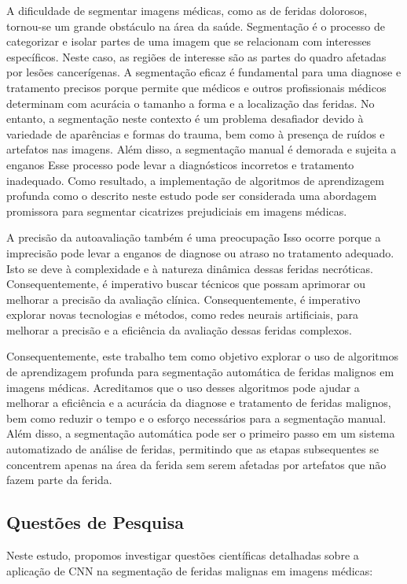 A dificuldade de segmentar imagens médicas, como as de feridas dolorosos, tornou-se um grande obstáculo na área da saúde. Segmentação é o processo de categorizar e isolar partes de uma imagem que se relacionam com interesses específicos. Neste caso, as regiões de interesse são as partes do quadro afetadas por lesões cancerígenas. A segmentação eficaz é fundamental para uma diagnose e tratamento precisos porque permite que médicos e outros profissionais médicos determinam com acurácia o tamanho a forma e a localização das feridas. No entanto, a segmentação neste contexto é um problema desafiador devido à variedade de aparências e formas do trauma, bem como à presença de ruídos e artefatos nas imagens. Além disso, a segmentação manual é demorada e sujeita a enganos Esse processo pode levar a diagnósticos incorretos e tratamento inadequado. Como resultado, a implementação de algoritmos de aprendizagem profunda como o descrito neste estudo pode ser considerada uma abordagem promissora para segmentar cicatrizes prejudiciais em imagens médicas.

A precisão da autoavaliação também é uma preocupação Isso ocorre porque a imprecisão pode levar a enganos de diagnose ou atraso no tratamento adequado. Isto se deve à complexidade e à natureza dinâmica dessas feridas necróticas. Consequentemente, é imperativo buscar técnicos que possam aprimorar ou melhorar a precisão da avaliação clínica. Consequentemente, é imperativo explorar novas tecnologias e métodos, como redes neurais artificiais, para melhorar a precisão e a eficiência da avaliação dessas feridas complexos.

Consequentemente, este trabalho tem como objetivo explorar o uso de algoritmos de aprendizagem profunda para segmentação automática de feridas malignos em imagens médicas. Acreditamos que o uso desses algoritmos pode ajudar a melhorar a eficiência e a acurácia da diagnose e tratamento de feridas malignos, bem como reduzir o tempo e o esforço necessários para a segmentação manual. Além disso, a segmentação automática pode ser o primeiro passo em um sistema automatizado de análise de feridas, permitindo que as etapas subsequentes se concentrem apenas na área da ferida sem serem afetadas por artefatos que não fazem parte da ferida.

 \subsection{Questões de Pesquisa}
Neste estudo, propomos investigar questões científicas detalhadas sobre a aplicação de \ac{CNN} na segmentação de feridas malignas em imagens médicas:

